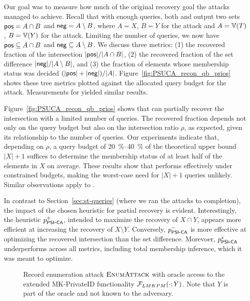 Our goal was to measure how much of the original recovery goal the attacks managed to achieve.
Recall that with enough queries, both \PSUCAattack{} and \mkpsiattack{} output two sets $\mathsf{pos} = A \cap B$ and $\mathsf{neg} = A \setminus B$,
where $A = X$, $B = Y$ for the \PSUCAattack{} attack and $A = \Ispace[T]$, $B = \Ispace[Y]$ for the \mkpsiattack{} attack.
Limiting the number of queries, we now have $\mathsf{pos} \subseteq A \cap B$ and $\mathsf{neg} \subseteq A \setminus B$.
We discuss three metrics: 
(1) the recovered fraction of the intersection $|\mathsf{pos}| / |A \cap B|$,
(2) the recovered fraction of the set difference $|\mathsf{neg}| / |A \setminus B|$, and
(3) the fraction of elements whose membership status was decided $(|\mathsf{pos}| + |\mathsf{neg}|) / |A|$.
Figure~\ref{fig:PSUCA_recon_qb_prios} shows these tree metrics plotted against the allocated query budget for the \PSUCAattack{} attack.
Measurements for \mkpsiattack{} yielded similar results.



Figure~\ref{fig:PSUCA_recon_qb_prios} shows that \PSUCAattack{} can partially recover the intersection with a limited number of queries. The recovered fraction depends not only on the query budget but also on the intersection ratio $\rho$, as expected, given its relationship to the number of queries. Our experiments indicate that, depending on $\rho$, a query budget of \SIrange{20}{40}{\percent} of the theoretical upper bound $|X| + 1$ suffices to determine the membership status of at least half of the elements in $X$ on average. These results show that \PSUCAattack{} performs effectively under constrained budgets, making the worst-case need for $|X| + 1$ queries unlikely. Similar observations apply to \mkpsiattack{}.

In contrast to Section~\ref{sec:st-queries} (where we ran the attacks to completion), the impact of the chosen heuristic for partial recovery is evident. Interestingly, the heuristic $p_{\mathsf{PSI\mbox{-}CA}}^+$, intended to maximize the recovery of $X \cap Y$, appears more efficient at increasing the recovery of $X \setminus Y$. Conversely, $p_{\mathsf{PSI\mbox{-}CA}}^-$ is more effective at optimizing the recovered intersection than the set difference. Morevoer, $p_{\mathsf{PSI\mbox{-}CA}}^*$ underperforms across all metrics, including total membership inference, which it was meant to optimize.



\clearpage
\begin{figure}[h]
	
	\caption{Record enumeration attack $\textsc{EnumAttack}$ with oracle access to the extended MK-PrivateID functionality $\mathcal{F}_{LMKPM}(\cdot; Y)$. 
	Note that $Y$ is part of the oracle and not known to the adversary.}\label{fig:rec_enum_attack}\label{fig:idx_to_seq}\label{fig:seq_to_idx}\label{fig:dict_infer}
\end{figure}

